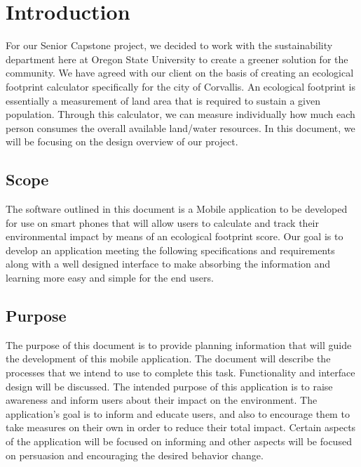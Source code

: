 \documentclass[onecolumn, draftclsnofoot,10pt, compsoc, tikz]{IEEEtran}
\begin{document}
\section{Introduction}
For our Senior Capstone project, we decided to work with the sustainability department here at Oregon State University to create a greener solution for the community. We have agreed with our client on the basis of creating an ecological footprint calculator specifically for the city of Corvallis. An ecological footprint is essentially a measurement of land area that is required to sustain a given population. Through this calculator, we can measure individually how much each person consumes the overall available land/water resources. In this document, we will be focusing on the design overview of our project.

\subsection{Scope}
The software outlined in this document is a Mobile application to be developed for use on smart phones that will allow users to calculate and track their environmental impact by means of an ecological footprint score. Our goal is to develop an application meeting the following specifications and requirements 
along with a well designed interface to make absorbing the information and learning more easy and simple for the end users.

\subsection{Purpose}
The purpose of this document is to provide planning information that will guide the development of this mobile application. The document will describe the processes that we intend to use to complete this task. Functionality and interface design will be discussed. The intended purpose of this application is to raise awareness and inform users about their impact on the environment. The application's goal is to inform and educate users, and also to encourage them to take measures on their own in order to reduce their total impact. Certain aspects of the application will be focused on informing and other aspects will be focused on persuasion and encouraging the desired behavior change.
\end{document}
